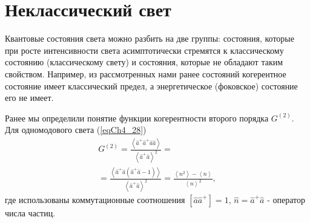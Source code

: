 \chapter{Неклассический свет}
\label{chNonClass}
Квантовые состояния света можно разбить на две группы: состояния,
которые при росте интенсивности света асимптотически стремятся к
классическому состоянию (классическому свету) и состояния, которые не
обладают таким свойством. Например, из рассмотренных нами ранее
состояний когерентное состояние имеет классический предел, а
энергетическое (фоковское) состояние его не имеет.

Ранее мы определили понятие функции когерентности второго порядка 
$G^{(2)}$. Для одномодового света (\ref{eqCh4_28})
\begin{eqnarray}
G^{(2)} = \frac{\left<\hat{a}^{+}\hat{a}^{+}\hat{a}\hat{a}\right>}
{\left<\hat{a}^{+}\hat{a}\right>^2} = 
\nonumber \\
= 
\frac{\left<\hat{a}^{+}\hat{a}\left(\hat{a}^{+}\hat{a} - 1\right)\right>}
{\left<\hat{a}^{+}\hat{a}\right>^2} = 
\frac{\left<n^2\right> - \left<n\right>}{\left<n\right>^2},
\label{eqPart3_Nonclass_Nonclass1}
\end{eqnarray}
где использованы коммутационные соотношения
$\left[\hat{a}\hat{a}^{+}\right] = 1$, 
$\hat{n} = \hat{a}^{+}\hat{a}$ - оператор числа частиц.

